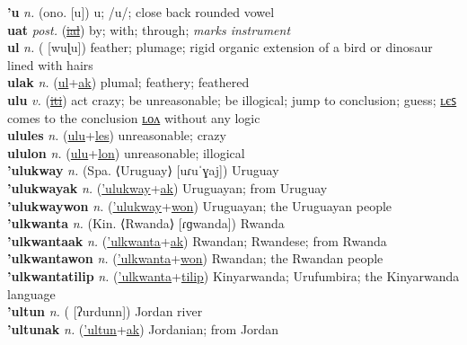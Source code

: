 \textbf{'u} \textit{n.} (ono. [u])
u; /u/; close back rounded vowel \label{'u} \\
\textbf{uat} \textit{post.} (\hyperref[ial]{\sout{ial}})
by; with; through; \textit{marks instrument} \label{uat} \\
\textbf{ul} \textit{n.} ( [wuɭu])
feather; plumage; rigid organic extension of a bird or dinosaur lined with hairs \label{ul} \\
\textbf{ulak} \textit{n.} (\hyperref[ul]{ul}+\hyperref[ak]{ak})
plumal; feathery; feathered \label{ulak} \\
\textbf{ulu} \textit{v.} (\hyperref[iti]{\sout{iti}})
act crazy; be unreasonable; be illogical; jump to conclusion; guess; \hyperref[ulules]{ʟєꜱ} comes to the conclusion \hyperref[ululon]{ʟᴏᴧ} without any logic \label{ulu} \\
\textbf{ulules} \textit{n.} (\hyperref[ulu]{ulu}+\hyperref[les]{les})
unreasonable; crazy \label{ulules} \\
\textbf{ululon} \textit{n.} (\hyperref[ulu]{ulu}+\hyperref[lon]{lon})
unreasonable; illogical \label{ululon} \\
\textbf{'ulukway} \textit{n.} (Spa. ⟨Uruguay⟩ [uɾuˈɣaj])
Uruguay \label{'ulukway} \\
\textbf{'ulukwayak} \textit{n.} (\hyperref['ulukway]{'ulukway}+\hyperref[ak]{ak})
Uruguayan; from Uruguay \label{'ulukwayak} \\
\textbf{'ulukwaywon} \textit{n.} (\hyperref['ulukway]{'ulukway}+\hyperref[won]{won})
Uruguayan; the Uruguayan people \label{'ulukwaywon} \\
\textbf{'ulkwanta} \textit{n.} (Kin. ⟨Rwanda⟩ [ɾɡwanda])
Rwanda \label{'ulkwanta} \\
\textbf{'ulkwantaak} \textit{n.} (\hyperref['ulkwanta]{'ulkwanta}+\hyperref[ak]{ak})
Rwandan; Rwandese; from Rwanda \label{'ulkwantaak} \\
\textbf{'ulkwantawon} \textit{n.} (\hyperref['ulkwanta]{'ulkwanta}+\hyperref[won]{won})
Rwandan; the Rwandan people \label{'ulkwantawon} \\
\textbf{'ulkwantatilip} \textit{n.} (\hyperref['ulkwanta]{'ulkwanta}+\hyperref[tilip]{tilip})
Kinyarwanda; Urufumbira; the Kinyarwanda language \label{'ulkwantatilip} \\
\textbf{'ultun} \textit{n.} ( [ʔurdunn])
Jordan river \label{'ultun} \\
\textbf{'ultunak} \textit{n.} (\hyperref['ultun]{'ultun}+\hyperref[ak]{ak})
Jordanian; from Jordan \label{'ultunak} \\
